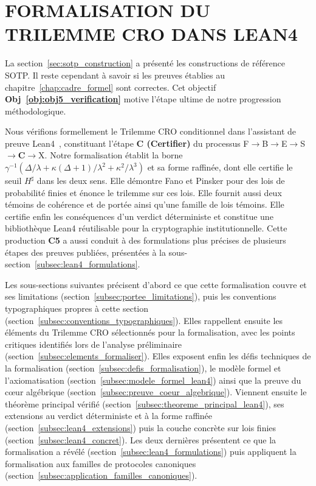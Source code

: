
\section{FORMALISATION DU TRILEMME CRO DANS LEAN4}
\label{sec:lean4}
\begin{sloppypar}
La section~\ref{sec:sotp_construction} a pr\'esent\'e les constructions de r\'ef\'erence
SOTP.
Il reste cependant \`a savoir si les preuves \'etablies au
chapitre~\ref{chap:cadre_formel} sont correctes. Cet objectif
\textbf{Obj~\ref{obj:obj5_verification}} motive l'\'etape ultime de notre progression
m\'ethodologique.

Nous v\'erifions formellement le Trilemme CRO conditionnel dans
l'assistant de preuve Lean4~\cite{Lean4,moura2015lean,Avigad2019}, constituant
l'\'etape \textbf{C (Certifier)} du processus F$\to$B$\to$E$\to$S$\to$\textbf{C}$\to$X.
Notre formalisation \'etablit la borne
$\gamma^{-1}(\Delta/\lambda + \kappa(\Delta+1)/\lambda^2 + \kappa^2/\lambda^3)$
et sa forme raffin\'ee, dont elle certifie le seuil $H^\sharp$ dans les deux sens. Elle
d\'emontre Fano et Pinsker pour des lois de probabilit\'e finies et \'enonce le trilemme
sur ces lois. Elle fournit aussi deux t\'emoins de coh\'erence et de port\'ee ainsi qu'une
famille de lois t\'emoins. Elle certifie enfin les cons\'equences d'un verdict
d\'eterministe et constitue une biblioth\`eque Lean4
r\'eutilisable pour la cryptographie institutionnelle. Cette production \textbf{C5}
a aussi conduit \`a des formulations plus pr\'ecises de plusieurs \'etapes des
preuves publi\'ees, pr\'esent\'ees \`a la sous-section~\ref{subsec:lean4_formulations}.

Les sous-sections suivantes pr\'ecisent d'abord ce que cette formalisation
couvre et ses limitations (section~\ref{subsec:portee_limitations}), puis les
conventions typographiques propres \`a cette section
(section~\ref{subsec:conventions_typographiques}). Elles rappellent ensuite les
\'el\'ements du Trilemme CRO s\'electionn\'es pour la formalisation, avec les points
critiques identifi\'es lors de l'analyse pr\'eliminaire
(section~\ref{subsec:elements_formaliser}). Elles exposent enfin les d\'efis techniques
de la formalisation (section~\ref{subsec:defis_formalisation}), le mod\`ele formel
et l'axiomatisation (section~\ref{subsec:modele_formel_lean4}) ainsi que la preuve
du c\oe ur alg\'ebrique (section~\ref{subsec:preuve_coeur_algebrique}). Viennent
ensuite le th\'eor\`eme principal v\'erifi\'e
(section~\ref{subsec:theoreme_principal_lean4}), ses extensions au verdict d\'eterministe
et \`a la forme raffin\'ee (section~\ref{subsec:lean4_extensions}) puis la couche concr\`ete
sur lois finies (section~\ref{subsec:lean4_concret}). Les deux derni\`eres pr\'esentent ce
que la formalisation a r\'ev\'el\'e (section~\ref{subsec:lean4_formulations}) puis appliquent la
formalisation aux familles de protocoles canoniques
(section~\ref{subsec:application_familles_canoniques}).


\end{sloppypar}

